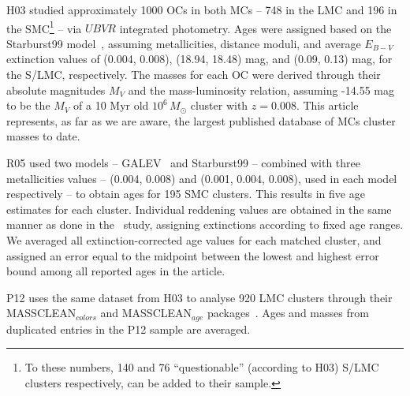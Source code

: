 \documentclass[a4paper,fleqn,usenatbib]{mnras}
\begin{document}
H03 studied approximately 1000 OCs in both MCs -- 748 in the LMC and 196 in the
SMC\footnote{To these numbers, 140 and 76 ``questionable'' (according to
H03) S/LMC clusters respectively, can be added to their sample.} --
via $UBVR$ integrated photometry. Ages were assigned based on the Starburst99
model~\citep{Leitherer_1999}, assuming metallicities, distance moduli, and
average $E_{B-V}$ extinction values of (0.004, 0.008), (18.94, 18.48) mag, and 
(0.09, 0.13) mag, for the S/LMC, respectively.
The masses for each OC were derived through their absolute
magnitudes $M_V$ and the mass-luminosity relation, assuming -14.55 mag to be the
$M_V$ of a 10 Myr old $10^6\,M_{\odot}$ cluster with $z=0.008$.
This article represents, as far as we are aware, the largest
published database of MCs cluster masses to date.

R05 used two models -- GALEV~\citep{Anders_2003} and Starburst99 -- combined
with three metallicities values -- (0.004, 0.008) and (0.001, 0.004, 0.008),
used in each model respectively -- to obtain ages for 195 SMC clusters.
This results in five age estimates for each cluster. Individual reddening
values are obtained in the same manner as done in the~\cite{Harris_2004} study,
assigning extinctions according to fixed age ranges.
%
We averaged all extinction-corrected age values for each matched cluster,
and assigned an error equal to the midpoint between the lowest and
highest error bound among all reported ages in the article.

P12 uses the same dataset from H03 to analyse 920 LMC clusters through their
MASSCLEAN$_{colors}$ and MASSCLEAN$_{age}$
packages~\citep{Popescu_2010a,Popescu_2010b}. Ages and masses from duplicated
entries in the P12 sample are averaged.

\end{document}
